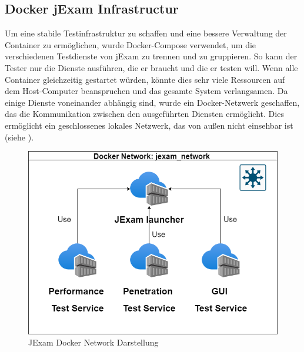 \subsection{Docker jExam Infrastructur}
Um eine stabile Testinfrastruktur zu schaffen und eine bessere
Verwaltung der Container zu ermöglichen, wurde Docker-Compose
verwendet, um die verschiedenen Testdienste von jExam zu trennen
und zu gruppieren. So kann der Tester nur die Dienste ausführen,
die er braucht und die er testen will. Wenn alle Container
gleichzeitig gestartet würden, könnte dies sehr viele Ressourcen auf
dem Host-Computer beanspruchen und das gesamte System verlangsamen.
Da einige Dienste voneinander abhängig sind, wurde ein Docker-Netzwerk
geschaffen, das die Kommunikation zwischen den ausgeführten Diensten
ermöglicht. Dies ermöglicht ein geschlossenes lokales Netzwerk, das
von außen nicht einsehbar ist (siehe ).

\begin{figure}[H]
    \centering
    \includegraphics[scale=0.6]{images/all.drawio}
    \caption{JExam Docker Network Darstellung} \label{fig:dock-net}
\end{figure}






